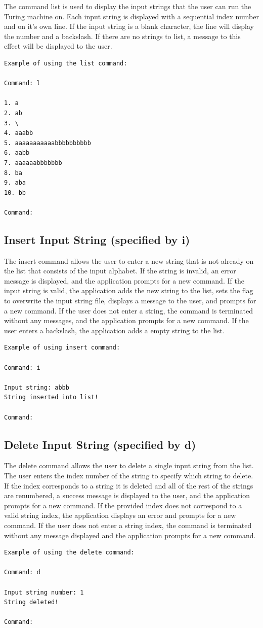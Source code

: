 \documentclass{report}
\begin{document}
The command list is used to display the input strings that the user can run the Turing machine on. Each input string is displayed with a sequential index number and on it's own line. If the input string is a blank character, the line will display the number and a backslash. If there are no strings to list, a message to this effect will be displayed to the user.

\begin{verbatim}
Example of using the list command:

Command: l

1. a
2. ab
3. \
4. aaabb
5. aaaaaaaaaaabbbbbbbbbb
6. aabb
7. aaaaaabbbbbbb
8. ba
9. aba
10. bb

Command: 
\end{verbatim}

\subsection{Insert Input String (specified by i)} 

The insert command allows the user to enter a new string that is not already on the list that consists of the input alphabet. If the string is invalid, an error message is displayed, and the application prompts for a new command. If the input string is valid, the application adds the new string to the list, sets the flag to overwrite the input string file, displays a message to the user, and prompts for a new command. If the user does not enter a string, the command is terminated without any messages, and the application prompts for a new command. If the user enters a backslash, the application adds a empty string to the list.

\begin{verbatim}
Example of using insert command:

Command: i

Input string: abbb
String inserted into list!
    
Command: 
\end{verbatim}

\subsection{Delete Input String (specified by d)} 
The delete command allows the user to delete a single input string from the list. The user enters the index number of the string to specify which string to delete. If the index corresponds to a string it is deleted and all of the rest of the strings are renumbered, a success message is displayed to the user, and the application prompts for a new command. If the provided index does not correspond to a valid string index, the application displays an error and prompts for a new command. If the user does not enter a string index, the command is terminated without any message displayed and the application prompts for a new command.
\begin{verbatim}
Example of using the delete command:

Command: d

Input string number: 1
String deleted!

Command: 
\end{verbatim}
\end{document}
